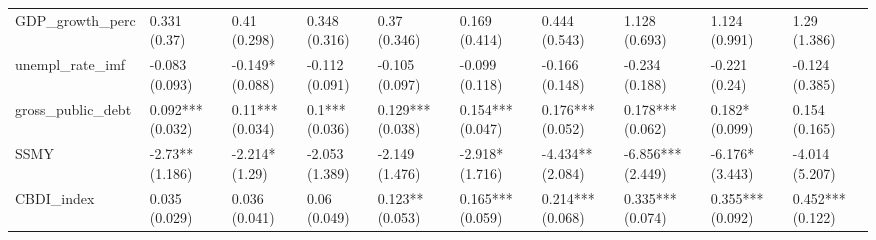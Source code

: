 \begin{table}[ht]
\begin{tabular}{llllllllll}
  GDP\_growth\_perc & 0.331 (0.37) & 0.41 (0.298) & 0.348 (0.316) & 0.37 (0.346) & 0.169 (0.414) & 0.444 (0.543) & 1.128 (0.693) & 1.124 (0.991) & 1.29 (1.386) \\ 
  unempl\_rate\_imf & -0.083 (0.093) & -0.149* (0.088) & -0.112 (0.091) & -0.105 (0.097) & -0.099 (0.118) & -0.166 (0.148) & -0.234 (0.188) & -0.221 (0.24) & -0.124 (0.385) \\ 
  gross\_public\_debt & 0.092*** (0.032) & 0.11*** (0.034) & 0.1*** (0.036) & 0.129*** (0.038) & 0.154*** (0.047) & 0.176*** (0.052) & 0.178*** (0.062) & 0.182* (0.099) & 0.154 (0.165) \\ 
  SSMY & -2.73** (1.186) & -2.214* (1.29) & -2.053 (1.389) & -2.149 (1.476) & -2.918* (1.716) & -4.434** (2.084) & -6.856*** (2.449) & -6.176* (3.443) & -4.014 (5.207) \\ 
  CBDI\_index & 0.035 (0.029) & 0.036 (0.041) & 0.06 (0.049) & 0.123** (0.053) & 0.165*** (0.059) & 0.214*** (0.068) & 0.335*** (0.074) & 0.355*** (0.092) & 0.452*** (0.122) \\ 
   \bottomrule
\end{tabular}
\endgroup
\end{table}
